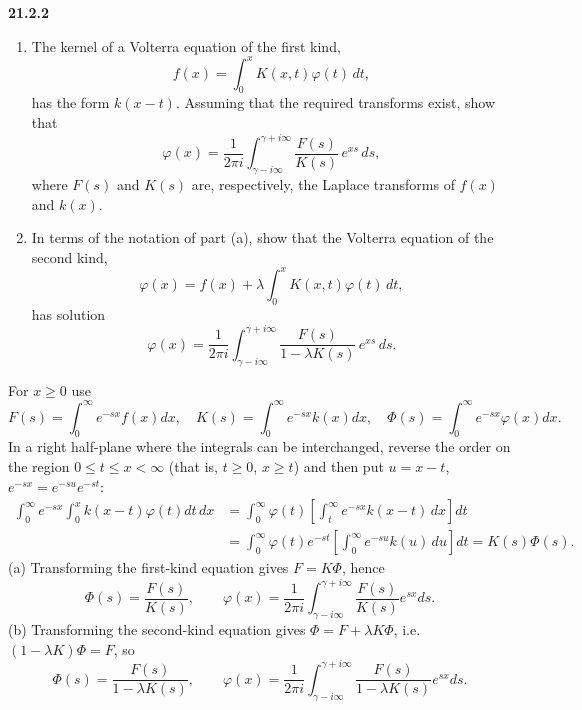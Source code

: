 \par\bigskip
\noindent\textbf{21.2.2}
\begin{enumerate}
\item[(a)] The kernel of a Volterra equation of the first kind,
\[
f(x)=\int_{0}^{x}K(x,t)\varphi(t)\,dt,
\]
has the form $k(x-t)$. Assuming that the required transforms
exist, show that
\[
\varphi(x)=\frac{1}{2\pi i}\int_{\gamma-i\infty}^{\gamma+i\infty}
\frac{F(s)}{K(s)}\,e^{xs}\,ds,
\]
where $F(s)$ and $K(s)$ are, respectively, the Laplace
transforms of $f(x)$ and $k(x)$.
\item[(b)] In terms of the notation of part (a), show that the
Volterra equation of the second kind,
\[
\varphi(x)=f(x)+\lambda\int_{0}^{x}K(x,t)\varphi(t)\,dt,
\]
has solution
\[
\varphi(x)=\frac{1}{2\pi i}\int_{\gamma-i\infty}^{\gamma+i\infty}
\frac{F(s)}{1-\lambda K(s)}\,e^{xs}\,ds.
\]
\end{enumerate}
\solution
For $x\ge0$ use
\[
F(s)=\int_0^\infty e^{-sx}f(x)dx,\quad
K(s)=\int_0^\infty e^{-sx}k(x)dx,\quad
\Phi(s)=\int_0^\infty e^{-sx}\varphi(x)dx.
\]
In a right half-plane where the integrals can be interchanged,
reverse the order on the region $0\le t\le x<\infty$ (that is,
$t\ge0$, $x\ge t$) and then put $u=x-t$, $e^{-sx}=e^{-su}e^{-st}$:
\[
\begin{aligned}
\int_0^\infty e^{-sx}\int_0^xk(x-t)\varphi(t)dt\,dx
&=\int_0^\infty\varphi(t)\left[\int_t^\infty
e^{-sx}k(x-t)\,dx\right]dt\\
&=\int_0^\infty\varphi(t)e^{-st}\left[\int_0^\infty
e^{-su}k(u)\,du\right]dt
=K(s)\Phi(s).
\end{aligned}
\]
(a) Transforming the first-kind equation gives $F=K\Phi$, hence
\[
\Phi(s)=\frac{F(s)}{K(s)},\qquad
\boxed{\varphi(x)=\frac1{2\pi i}
\int_{\gamma-i\infty}^{\gamma+i\infty}
\frac{F(s)}{K(s)}e^{sx}ds}.
\]
(b) Transforming the second-kind equation gives
$\Phi=F+\lambda K\Phi$, i.e.\ $(1-\lambda K)\Phi=F$, so
\[
\Phi(s)=\frac{F(s)}{1-\lambda K(s)},\qquad
\boxed{\varphi(x)=\frac1{2\pi i}
\int_{\gamma-i\infty}^{\gamma+i\infty}
\frac{F(s)}{1-\lambda K(s)}e^{sx}ds}.
\]


